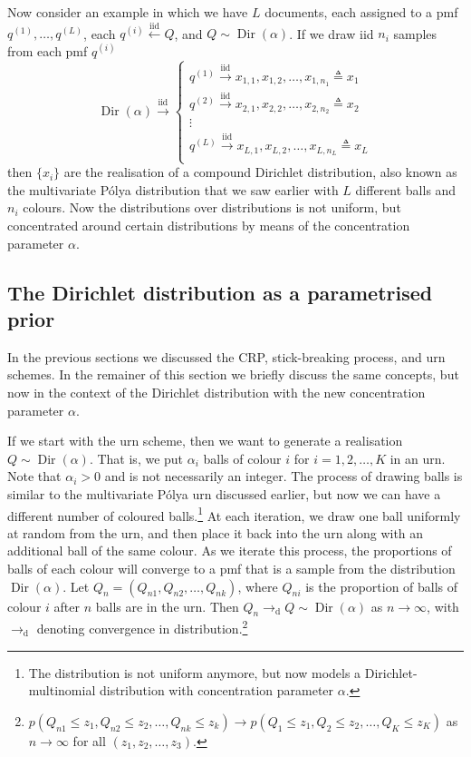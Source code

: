 Now consider an example in which we have $L$ documents, each assigned to a pmf $q^{(1)}, \ldots, q^{(L)}$, each $q^{(i)} \overset{\text{iid}}{\leftarrow} Q$, and $Q\sim\operatorname{Dir}(\alpha)$. If we draw iid $n_i$ samples from each pmf $q^{(i)}$
\begin{equation}
	\operatorname{Dir}(\alpha) \overset{\text{iid}}{\rightarrow}
    \begin{cases}
    q^{(1)} \overset{\text{iid}}{\rightarrow} x_{1,1}, x_{1,2},\ldots,x_{1,n_1} \triangleq x_1\\
    q^{(2)} \overset{\text{iid}}{\rightarrow} x_{2,1}, x_{2,2},\ldots,x_{2,n_2} \triangleq x_2 \\
    \vdots \\
    q^{(L)} \overset{\text{iid}}{\rightarrow} x_{L,1}, x_{L,2},\ldots,x_{L,n_L} \triangleq x_L \\
  \end{cases}
\end{equation}
then $\{x_i\}$ are the realisation of a compound Dirichlet distribution, also known as the multivariate P\'olya distribution that we saw earlier with $L$ different balls and $n_i$ colours. Now the distributions over distributions is not uniform, but concentrated around certain distributions by means of the concentration parameter $\alpha$.

\subsection{The Dirichlet distribution as a parametrised prior}

In the previous sections we discussed the CRP, stick-breaking process, and urn schemes. In the remainer of this section we briefly discuss the same concepts, but now in the context of the Dirichlet distribution with the new concentration parameter $\alpha$. 

If we start with the urn scheme, then we want to generate a realisation $Q\sim\operatorname{Dir}(\alpha)$. That is, we put $\alpha_i$ balls of colour $i$ for $i=1,2,\ldots,K$ in an urn. Note that $\alpha_i>0$ and is not necessarily an integer. The process of drawing balls is similar to the multivariate P\'olya urn discussed earlier, but now we can have a different number of coloured balls.\footnote{The distribution is not uniform anymore, but now models a Dirichlet-multinomial distribution with concentration parameter $\alpha$.} At each iteration, we draw one ball uniformly at random from the urn, and then place it back into the urn along with an additional ball of the same colour. As we iterate this process, the proportions of balls of each colour will converge to a pmf that is a sample from the distribution $\operatorname{Dir}(\alpha)$. Let $Q_n = (Q_{n1}, Q_{n2},\ldots,Q_{nk})$, where $Q_{ni}$ is the proportion of balls of colour $i$ after $n$ balls are in the urn. Then $Q_n \rightarrow_\text{d} Q \sim \operatorname{Dir}(\alpha)$ as $n\rightarrow\infty$, with $\rightarrow_\text{d}$ denoting convergence in distribution.\footnote{$p(Q_{n1}\leq z_1, Q_{n2}\leq z_2, \ldots, Q_{nk}\leq z_k) \rightarrow p(Q_1\leq z_1, Q_2\leq z_2,\ldots,Q_K\leq z_K)$ as $n\rightarrow\infty$ for all $(z_1,z_2,\ldots,z_3)$.} 


